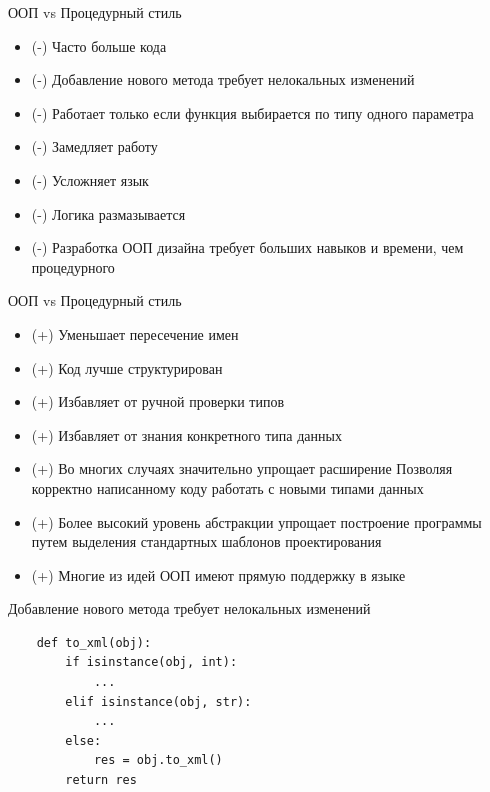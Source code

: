 \documentclass{article}
\begin{document}
\begin{center} ООП vs Процедурный стиль \end{center}
\begin{itemize}
    \item (-) Часто больше кода
    \item (-) Добавление нового метода требует нелокальных изменений
    \item (-) Работает только если функция выбирается по типу одного параметра
    \item (-) Замедляет работу
    \item (-) Усложняет язык
    \item (-) Логика размазывается
    \item (-) Разработка ООП дизайна требует больших навыков и времени, чем процедурного
\end{itemize}
\newpage

\begin{center} ООП vs Процедурный стиль \end{center}
\begin{itemize}
    \item (+) Уменьшает пересечение имен
    \item (+) Код лучше структурирован
    \item (+) Избавляет от ручной проверки типов
    \item (+) Избавляет от знания конкретного типа данных
    \item (+) Во многих случаях значительно упрощает расширение
              Позволяя корректно написанному коду работать с новыми типами данных
    \item (+) Более высокий уровень абстракции упрощает построение программы
              путем выделения стандартных шаблонов проектирования
    \item (+) Многие из идей ООП имеют прямую поддержку в языке
\end{itemize}
\newpage

\begin{center} Добавление нового метода требует нелокальных изменений \end{center}
\begin{lstlisting}
    def to_xml(obj):
        if isinstance(obj, int):
            ...
        elif isinstance(obj, str):
            ...
        else:
            res = obj.to_xml()
        return res
\end{lstlisting}
\newpage
\end{document}
